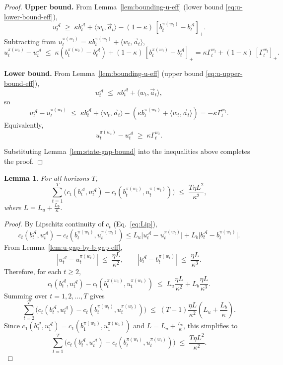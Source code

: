 \documentclass[11pt]{article}
\newtheorem{Thm:Lemma}{Lemma}
\begin{document}
\begin{proof}
\textbf{Upper bound.}  
From Lemma~\ref{lem:bounding-u-eff} (lower bound \eqref{eq:u-lower-bound-eff}),
\[
u_t^\mathcal{A}
\;\ge\;
\kappa b_t^\mathcal{A} + \langle w_t,\vec{a}_t\rangle
-(1-\kappa)\,[b_t^{\pi(w_t)}-b_t^\mathcal{A}]_+ .
\]
Subtracting from \(u_t^{\pi(w_t)} = \kappa b_t^{\pi(w_t)} + \langle w_t,\vec{a}_t\rangle\),
\[
u_t^{\pi(w_t)} - u_t^\mathcal{A}
\;\le\;
\kappa (b_t^{\pi(w_t)}-b_t^\mathcal{A})
+(1-\kappa)\,[b_t^{\pi(w_t)}-b_t^\mathcal{A}]_+
= \kappa \Gamma_t^{w_t} + (1-\kappa)\,[\Gamma_t^{w_t}]_+ .
\]

\textbf{Lower bound.}  
From Lemma~\ref{lem:bounding-u-eff} (upper bound \eqref{eq:u-upper-bound-eff}),
\[
u_t^\mathcal{A}
\;\le\;
\kappa b_t^\mathcal{A} + \langle w_t,\vec{a}_t\rangle ,
\]
so
\[
u_t^\mathcal{A} - u_t^{\pi(w_t)}
\;\le\;
\kappa b_t^\mathcal{A} + \langle w_t,\vec{a}_t\rangle
- (\kappa b_t^{\pi(w_t)} + \langle w_t,\vec{a}_t\rangle)
= -\kappa\Gamma_t^{w_t}.
\]
Equivalently,
\[
u_t^{\pi(w_t)} - u_t^\mathcal{A}
\;\ge\; \kappa \Gamma_t^{w_t}.
\]


Substituting Lemma~\ref{lem:state-gap-bound} into the inequalities above completes the proof.
\end{proof}











\begin{Thm:Lemma}
\label{lem:stab-sum}
For all horizons \(T\),
\[
\sum_{t=1}^T \Big(
c_t\!\left(b_t^\mathcal{A},u_t^\mathcal{A}\right)
-
c_t\!\left(b_t^{\pi(w_t)},u_t^{\pi(w_t)}\right)
\Big)
\;\le\;
\frac{T \eta L^2}{\kappa^2},
\]
where \(L = L_u + \tfrac{L_b}{\kappa}\).
\end{Thm:Lemma}

\begin{proof}
By Lipschitz continuity of \(c_t\) (Eq.~\eqref{eq:Lip}),
\[
c_t\!\left(b_t^\mathcal{A},u_t^\mathcal{A}\right)
-
c_t\!\left(b_t^{\pi(w_t)},u_t^{\pi(w_t)}\right) 
\le
L_u \big|u_t^\mathcal{A} - u_t^{\pi(w_t)}\big|
+ L_b \big|b_t^\mathcal{A} - b_t^{\pi(w_t)}\big|.
\]
From Lemma~\ref{lem:u-gap-by-b-gap-eff},
\[
|u_t^\mathcal{A} - u_t^{\pi(w_t)}|
\;\le\; \frac{\eta L}{\kappa^2},
\qquad
|b_t^\mathcal{A} - b_t^{\pi(w_t)}|
\;\le\; \frac{\eta L}{\kappa^3}.
\]
Therefore, for each \(t \ge 2\),
\[
c_t\!\left(b_t^\mathcal{A},u_t^\mathcal{A}\right)
-
c_t\!\left(b_t^{\pi(w_t)},u_t^{\pi(w_t)}\right)
\;\le\;
L_u \frac{\eta L}{\kappa^2}
+ L_b \frac{\eta L}{\kappa^3}.
\]
Summing over \(t=1,2,\dots,T\) gives
\[
\sum_{t=2}^T
\Big(
c_t(b_t^\mathcal{A},u_t^\mathcal{A})
-
c_t(b_t^{\pi(w_t)},u_t^{\pi(w_t)})
\Big)
\;\le\;
(T-1)\frac{\eta L}{\kappa^2}\left(
L_u 
+  \frac{L_b}{\kappa}
\right).
\]
Since 
\(c_1(b_1^\mathcal{A},u_1^\mathcal{A})
=
c_1(b_1^{\pi(w_1)},u_1^{\pi(w_1)})\) and \(L = L_u + \tfrac{L_b}{\kappa}\), this simplifies to
\[
\sum_{t=1}^T
\Big(
c_t(b_t^\mathcal{A},u_t^\mathcal{A})
-
c_t(b_t^{\pi(w_t)},u_t^{\pi(w_t)})
\Big)
\;\le\;
\frac{T \eta L^2}{\kappa^2}.
\]
\end{proof}
\end{document}
